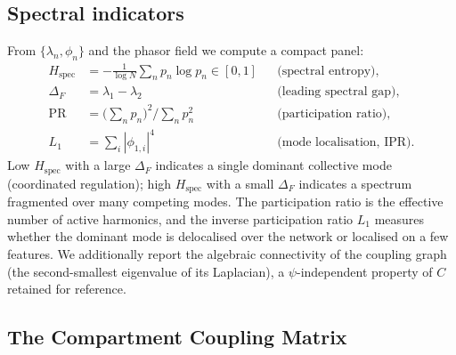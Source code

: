 \documentclass[preprint,12pt,amsmath,amssymb,superscriptaddress,floatfix]{revtex4-2}
\theoremstyle{definition}
\theoremstyle{plain}
\newcommand{\PR}{\mathrm{PR}}
\newcommand{\Hspec}{H_{\mathrm{spec}}}
\begin{document}
\subsection{Spectral indicators}
\label{sec:theory-indicators}

From $\{\lambda_n,\phi_n\}$ and the phasor field we compute a compact panel:
\begin{align}
  \Hspec &= -\tfrac{1}{\log N}\textstyle\sum_n p_n\log p_n \in[0,1]
    &&\text{(spectral entropy)},\\
  \Delta_F &= \lambda_1-\lambda_2 &&\text{(leading spectral gap)},\\
  \PR &= \big(\textstyle\sum_n p_n\big)^2 \big/ \textstyle\sum_n p_n^2
    &&\text{(participation ratio)},\\
  L_1 &= \textstyle\sum_i |\phi_{1,i}|^4 &&\text{(mode localisation, IPR)}.
\end{align}
Low $\Hspec$ with a large $\Delta_F$ indicates a single dominant collective mode
(coordinated regulation); high $\Hspec$ with a small $\Delta_F$ indicates a
spectrum fragmented over many competing modes. The participation ratio is the
effective number of active harmonics, and the inverse participation ratio $L_1$
measures whether the dominant mode is delocalised over the network or localised
on a few features. We additionally report the algebraic connectivity of the
coupling graph (the second-smallest eigenvalue of its Laplacian), a
$\psi$-independent property of $C$ retained for reference.

\subsection{The Compartment Coupling Matrix}
\label{sec:theory-ost}
\end{document}
